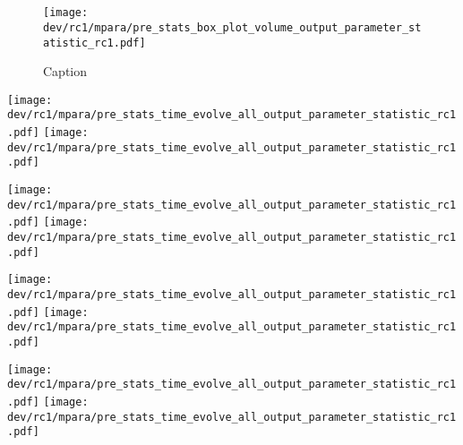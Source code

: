 \chapter{} %
\label{app:modelAnalysis}
%
%
%
\begin{figure}[!h]
    \centering
    \texttt{[image: dev/rc1/mpara/pre\_stats\_box\_plot\_volume\_output\_parameter\_statistic\_rc1.pdf]}
    \caption{Caption}
    \label{app:appModelVolumeBoxPlot}
\end{figure}
%
%
%
%
\setlength{\tikzwidth}{\textwidth}
\begin{sidewaysfigure}[]
\centering
\texttt{[image: dev/rc1/mpara/pre\_stats\_time\_evolve\_all\_output\_parameter\_statistic\_rc1.pdf]}
\texttt{[image: dev/rc1/mpara/pre\_stats\_time\_evolve\_all\_output\_parameter\_statistic\_rc1.pdf]}
\label{app:pste1}
\end{sidewaysfigure}
%
\begin{sidewaysfigure}[]
\centering
\texttt{[image: dev/rc1/mpara/pre\_stats\_time\_evolve\_all\_output\_parameter\_statistic\_rc1.pdf]}
\texttt{[image: dev/rc1/mpara/pre\_stats\_time\_evolve\_all\_output\_parameter\_statistic\_rc1.pdf]}
\label{app:pste2}
\end{sidewaysfigure}
%
\begin{sidewaysfigure}[]
\centering
\texttt{[image: dev/rc1/mpara/pre\_stats\_time\_evolve\_all\_output\_parameter\_statistic\_rc1.pdf]}
\texttt{[image: dev/rc1/mpara/pre\_stats\_time\_evolve\_all\_output\_parameter\_statistic\_rc1.pdf]}
\label{app:pste3}
\end{sidewaysfigure}
%
\begin{sidewaysfigure}[]
\centering
\texttt{[image: dev/rc1/mpara/pre\_stats\_time\_evolve\_all\_output\_parameter\_statistic\_rc1.pdf]}
\texttt{[image: dev/rc1/mpara/pre\_stats\_time\_evolve\_all\_output\_parameter\_statistic\_rc1.pdf]}
\label{app:pste4}
\end{sidewaysfigure}
